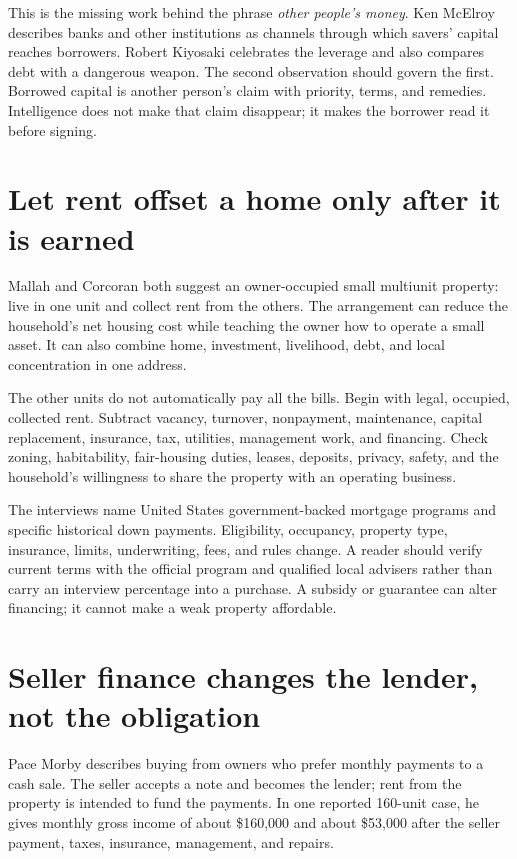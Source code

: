 This is the missing work behind the phrase \emph{other people's money}. Ken
McElroy describes banks and other institutions as channels through which
savers' capital reaches borrowers. Robert Kiyosaki celebrates the leverage and
also compares debt with a dangerous weapon. The second observation should
govern the first. Borrowed capital is another person's claim with priority,
terms, and remedies. Intelligence does not make that claim disappear; it makes
the borrower read it before signing.

\section{Let rent offset a home only after it is earned}

Mallah and Corcoran both suggest an owner-occupied small multiunit property:
live in one unit and collect rent from the others. The arrangement can reduce
the household's net housing cost while teaching the owner how to operate a
small asset. It can also combine home, investment, livelihood, debt, and local
concentration in one address.

The other units do not automatically pay all the bills. Begin with legal,
occupied, collected rent. Subtract vacancy, turnover, nonpayment, maintenance,
capital replacement, insurance, tax, utilities, management work, and financing.
Check zoning, habitability, fair-housing duties, leases, deposits, privacy,
safety, and the household's willingness to share the property with an
operating business.

The interviews name United States government-backed mortgage programs and
specific historical down payments. Eligibility, occupancy, property type,
insurance, limits, underwriting, fees, and rules change. A reader should verify
current terms with the official program and qualified local advisers rather
than carry an interview percentage into a purchase. A subsidy or guarantee can
alter financing; it cannot make a weak property affordable.

\section{Seller finance changes the lender, not the obligation}

Pace Morby describes buying from owners who prefer monthly payments to a cash
sale. The seller accepts a note and becomes the lender; rent from the property
is intended to fund the payments. In one reported 160-unit case, he gives
monthly gross income of about \$160,000 and about \$53,000 after the seller
payment, taxes, insurance, management, and repairs.

